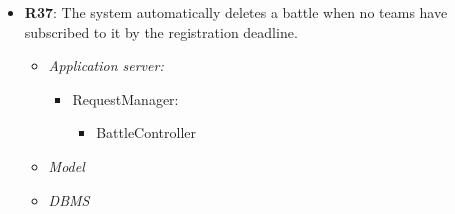 \begin{itemize}
                        \item \textbf{R37}: The system automatically deletes a battle when no teams have subscribed to it by the registration
deadline.
                    \begin{itemize}
                \item \textit{Application server:}\begin{itemize}
                    \item RequestManager:\begin{itemize}
                        \item BattleController
                    \end{itemize}
                \end{itemize}
                \item \textit{Model}
                \item \textit{DBMS}
                \end{itemize}
\end{itemize}